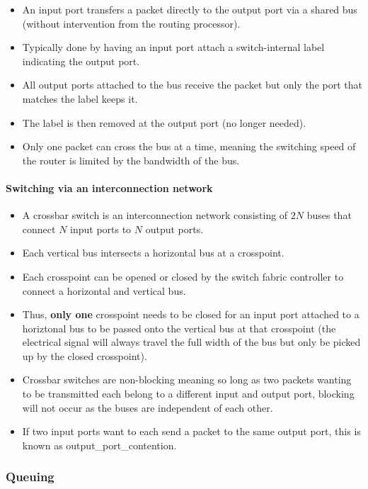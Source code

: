 \documentclass{article}
\begin{document}
\begin{itemize}
    \item An input port transfers a packet directly to the output port via a shared bus (without intervention from the routing processor).
    \item Typically done by having an input port attach a switch-internal label indicating the output port.
    \item All output ports attached to the bus receive the packet but only the port that matches the label keeps it.
    \item The label is then removed at the output port (no longer needed).
    \item Only one packet can cross the bus at a time, meaning the switching speed of the router is limited by the bandwidth of the bus.
\end{itemize}

\paragraph{Switching via an interconnection network}

\begin{itemize}
    \item A crossbar switch is an interconnection network consisting of $2N$ buses that connect $N$ input ports to $N$ output ports.
    \item Each vertical bus intersects a horizontal bus at a crosspoint.
    \item Each crosspoint can be opened or closed by the switch fabric controller to connect a horizontal and vertical bus.
    \item Thus, \textbf{only one} crosspoint needs to be closed for an input port attached to a horiztonal bus to be passed onto the vertical bus at that crosspoint (the electrical signal will always travel the full width of the bus but only be picked up by the closed crosspoint).
    \item Crossbar switches are non-blocking meaning so long as two packets wanting to be transmitted each belong to a different input and output port, blocking will not occur as the buses are independent of each other.
    \item If two input ports want to each send a packet to the same output port, this is known as \gls{output_port_contention}.
\end{itemize}

\subsubsection{Queuing}
\end{document}
